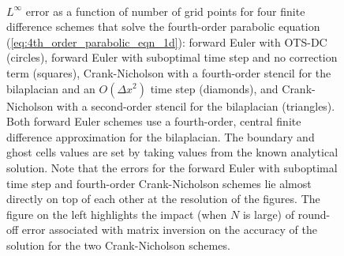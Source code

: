 \documentclass[fleqn,12pt,twoside]{article}
\def\dx{\Delta x}
\begin{document}
\begin{figure}[tb]
\begin{center}
\ \ 
\caption{$L^\infty$ error as a function of number of grid points for four
finite difference schemes that solve the fourth-order parabolic equation
(\ref{eq:4th_order_parabolic_eqn_1d}):
forward Euler with OTS-DC (circles),
forward Euler with suboptimal time step and no correction term (squares),
Crank-Nicholson with a fourth-order stencil for the bilaplacian and
an $O(\dx^2)$ time step (diamonds), and Crank-Nicholson with a second-order 
stencil for the bilaplacian (triangles).
Both forward Euler schemes use a fourth-order, central finite difference 
approximation for the bilaplacian.  The boundary and ghost cells values
are set by taking values from the known analytical solution.
Note that the errors for the forward Euler with suboptimal time step and 
fourth-order Crank-Nicholson schemes lie almost directly on top of each 
other at the resolution of the figures.  
The figure on the left highlights the impact (when $N$ is large) of round-off 
error associated with matrix inversion on the accuracy of the solution for the 
two Crank-Nicholson schemes.
}
\label{fig:4th_order_parabolic_eqn_1d_error}
\end{center}
\end{figure}
\end{document}
